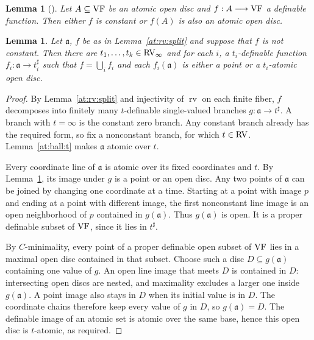 \documentclass[12pt]{amsart}
\theoremstyle{plain}
\newtheorem{lem}[thm]{Lemma}
\theoremstyle{definition}
\theoremstyle{remark}
\numberwithin{equation}{section}
\theoremstyle{plain}
\newcommand{\VF}{\textup{VF}}
\newcommand{\RV}{\textup{RV}}
\newcommand{\cmin}{$C$\nobreakdash}
\newcommand{\ga}{\mathfrak{a}}
\newcommand{\0}{\emptyset}
\newcommand{\fun}{\longrightarrow}
\newcommand{\sub}{\subseteq}
\DeclareMathOperator{\rv}{rv}
\begin{document}
\begin{lem}[{\cite[Lemma~3.13]{Yin:int:acvf}}]\label{atomic:open:ball:open}
Let $A \sub \VF$ be an atomic open disc and $f : A \fun \VF$ a definable function. Then either $f$ is constant or $f(A)$ is also an atomic open disc.
\end{lem}

\begin{lem}\label{atomic:open:multidisc}
Let $\ga$, $f$ be as in Lemma~\ref{at:rv:split} and suppose that $f$ is not constant. Then there are $t_1, \ldots, t_k \in \RV_\infty$ and for each $i$, a $t_i$-definable function $f_i : \ga \fun t^\sharp_i$ such that $f = \bigcup_i f_i$ and each $f_i(\ga)$ is either a point or a $t_i$-atomic open disc.
\end{lem}
\begin{proof}
By Lemma~\ref{at:rv:split} and injectivity of $\rv$ on each finite fiber, $f$ decomposes into finitely many $t$-definable single-valued branches $g:\ga\fun t^\sharp$. A branch with $t=\infty$ is the constant zero branch. Any constant branch already has the required form, so fix a nonconstant branch, for which $t\in\RV$. Lemma~\ref{at:ball:t} makes $\ga$ atomic over $t$.

Every coordinate line of $\ga$ is atomic over its fixed coordinates and $t$. By Lemma~\ref{atomic:open:ball:open}, its image under $g$ is a point or an open disc. Any two points of $\ga$ can be joined by changing one coordinate at a time. Starting at a point with image $p$ and ending at a point with different image, the first nonconstant line image is an open neighborhood of $p$ contained in $g(\ga)$. Thus $g(\ga)$ is open. It is a proper definable subset of $\VF$, since it lies in $t^\sharp$.

By \cmin-minimality, every point of a proper definable open subset of $\VF$ lies in a maximal open disc contained in that subset. Choose such a disc $D\sub g(\ga)$ containing one value of $g$. An open line image that meets $D$ is contained in $D$: intersecting open discs are nested, and maximality excludes a larger one inside $g(\ga)$. A point image also stays in $D$ when its initial value is in $D$. The coordinate chains therefore keep every value of $g$ in $D$, so $g(\ga)=D$. The definable image of an atomic set is atomic over the same base, hence this open disc is $t$-atomic, as required.

\end{proof}
\end{document}
